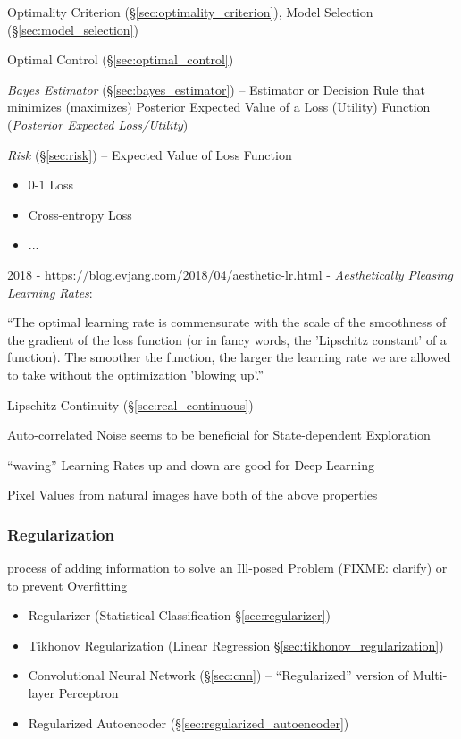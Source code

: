 \fist Optimality Criterion (\S\ref{sec:optimality_criterion}), Model Selection
(\S\ref{sec:model_selection})

\fist Optimal Control (\S\ref{sec:optimal_control})

\fist \emph{Bayes Estimator} (\S\ref{sec:bayes_estimator}) -- Estimator or
Decision Rule that minimizes (maximizes) Posterior Expected Value of a Loss
(Utility) Function (\emph{Posterior Expected Loss/Utility})

\fist \emph{Risk} (\S\ref{sec:risk}) -- Expected Value of Loss Function

\begin{itemize}
  \item $0$-$1$ Loss
  \item Cross-entropy Loss
  \item ...
\end{itemize}

2018 - \url{https://blog.evjang.com/2018/04/aesthetic-lr.html} - \emph{Aesthetically
  Pleasing Learning Rates}:

``The optimal learning rate is commensurate with the scale of the smoothness of
the gradient of the loss function (or in fancy words, the 'Lipschitz constant'
of a function). The smoother the function, the larger the learning rate we are
allowed to take without the optimization 'blowing up'.''

\fist Lipschitz Continuity (\S\ref{sec:real_continuous})

Auto-correlated Noise seems to be beneficial for State-dependent Exploration

``waving'' Learning Rates up and down are good for Deep Learning

Pixel Values from natural images have both of the above properties



\subsubsection{Regularization}\label{sec:regularization}

process of adding information to solve an Ill-posed Problem (FIXME: clarify) or
to prevent Overfitting

\begin{itemize}
  \item Regularizer (Statistical Classification \S\ref{sec:regularizer})
  \item Tikhonov Regularization (Linear Regression
    \S\ref{sec:tikhonov_regularization})
  \item Convolutional Neural Network (\S\ref{sec:cnn}) -- ``Regularized''
    version of Multi-layer Perceptron
  \item Regularized Autoencoder (\S\ref{sec:regularized_autoencoder})
\end{itemize}

